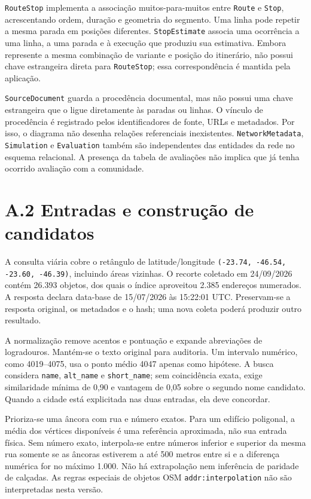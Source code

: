 \documentclass[12pt,oneside,a4paper,brazil]{abntex2}
\begin{document}
\begin{apendicesenv}
\texttt{RouteStop} implementa a associação muitos-para-muitos entre \texttt{Route} e \texttt{Stop}, acrescentando ordem, duração e geometria do segmento. Uma linha pode repetir a mesma parada em posições diferentes. \texttt{StopEstimate} associa uma ocorrência a uma linha, a uma parada e à execução que produziu sua estimativa. Embora represente a mesma combinação de variante e posição do itinerário, não possui chave estrangeira direta para \texttt{RouteStop}; essa correspondência é mantida pela aplicação.

\texttt{SourceDocument} guarda a procedência documental, mas não possui uma chave estrangeira que o ligue diretamente às paradas ou linhas. O vínculo de procedência é registrado pelos identificadores de fonte, URLs e metadados. Por isso, o diagrama não desenha relações referenciais inexistentes. \texttt{NetworkMetadata}, \texttt{Simulation} e \texttt{Evaluation} também são independentes das entidades da rede no esquema relacional. A presença da tabela de avaliações não implica que já tenha ocorrido avaliação com a comunidade.

\section*{A.2 Entradas e construção de candidatos}
A consulta viária cobre o retângulo de latitude/longitude \texttt{(-23.74, -46.54, -23.60, -46.39)}, incluindo áreas vizinhas. O recorte coletado em 24/09/2026 contém 26.393 objetos, dos quais o índice aproveitou 2.385 endereços numerados. A resposta declara data-base de 15/07/2026 às 15:22:01 UTC. Preservam-se a resposta original, os metadados e o hash; uma nova coleta poderá produzir outro resultado.

A normalização remove acentos e pontuação e expande abreviações de logradouros. Mantém-se o texto original para auditoria. Um intervalo numérico, como 4019--4075, usa o ponto médio 4047 apenas como hipótese. A busca considera \texttt{name}, \texttt{alt\_name} e \texttt{short\_name}; sem coincidência exata, exige similaridade mínima de 0,90 e vantagem de 0,05 sobre o segundo nome candidato. Quando a cidade está explicitada nas duas entradas, ela deve concordar.

Prioriza-se uma âncora com rua e número exatos. Para um edifício poligonal, a média dos vértices disponíveis é uma referência aproximada, não sua entrada física. Sem número exato, interpola-se entre números inferior e superior da mesma rua somente se as âncoras estiverem a até 500 metros entre si e a diferença numérica for no máximo 1.000. Não há extrapolação nem inferência de paridade de calçadas. As regras especiais de objetos OSM \texttt{addr:interpolation} não são interpretadas nesta versão.


\end{apendicesenv}
\end{document}
